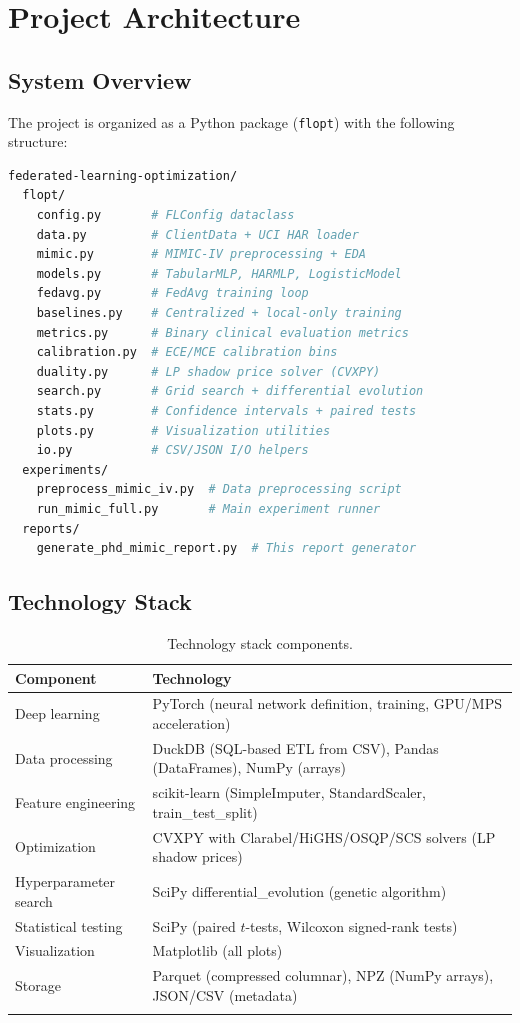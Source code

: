 \documentclass[11pt,a4paper]{report}
\begin{document}
\chapter{Project Architecture}

\section{System Overview}

The project is organized as a Python package (\texttt{flopt}) with the following structure:

\begin{lstlisting}[language=bash,basicstyle=\small\ttfamily]
federated-learning-optimization/
  flopt/
    config.py       # FLConfig dataclass
    data.py         # ClientData + UCI HAR loader
    mimic.py        # MIMIC-IV preprocessing + EDA
    models.py       # TabularMLP, HARMLP, LogisticModel
    fedavg.py       # FedAvg training loop
    baselines.py    # Centralized + local-only training
    metrics.py      # Binary clinical evaluation metrics
    calibration.py  # ECE/MCE calibration bins
    duality.py      # LP shadow price solver (CVXPY)
    search.py       # Grid search + differential evolution
    stats.py        # Confidence intervals + paired tests
    plots.py        # Visualization utilities
    io.py           # CSV/JSON I/O helpers
  experiments/
    preprocess_mimic_iv.py  # Data preprocessing script
    run_mimic_full.py       # Main experiment runner
  reports/
    generate_phd_mimic_report.py  # This report generator
\end{lstlisting}

\section{Technology Stack}

\begin{longtable}{lp{10cm}}
\toprule
\textbf{Component} & \textbf{Technology} \\
\midrule
\endhead
Deep learning & PyTorch (neural network definition, training, GPU/MPS acceleration) \\
Data processing & DuckDB (SQL-based ETL from CSV), Pandas (DataFrames), NumPy (arrays) \\
Feature engineering & scikit-learn (SimpleImputer, StandardScaler, train\_test\_split) \\
Optimization & CVXPY with Clarabel/HiGHS/OSQP/SCS solvers (LP shadow prices) \\
Hyperparameter search & SciPy differential\_evolution (genetic algorithm) \\
Statistical testing & SciPy (paired $t$-tests, Wilcoxon signed-rank tests) \\
Visualization & Matplotlib (all plots) \\
Storage & Parquet (compressed columnar), NPZ (NumPy arrays), JSON/CSV (metadata) \\
\bottomrule
\caption{Technology stack components.}
\label{tab:techstack}
\end{longtable}
\end{document}
